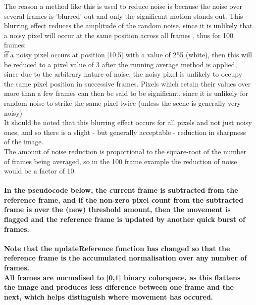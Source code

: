 The reason a method like this is used to reduce noise is because the noise over several frames is 'blurred' out and only the significant motion stands out. This blurring effect reduces the amplitude of the random noise, since it is unlikely that a noisy pixel will occur at the same position across all frames , thus for 100 frames: \\\t if a noisy pixel occurs at position [10,5] with a value of 255 (white), then this will be reduced to a pixel value of 3 after the running average method is applied, since due to the arbitrary nature of noise, the noisy pixel is unlikely to occupy the same pixel position in successive frames. Pixels which retain their values over more than a few frames can then be said to be significant, since it is unlikely for random noise to strike the same pixel twice (unless the scene is generally very noisy)\\
It should be noted that this blurring effect occurs for all pixels and not just noisy ones, and so there is a slight - but generally acceptable - reduction in sharpness of the image.\\
The amount of noise reduction is proportional to the square-root of the number of frames being averaged, so in the 100 frame example the reduction of noise would be a factor of 10.

\paragraph{
In the pseudocode below, the current frame is subtracted from the reference frame, and if the non-zero pixel count from the subtracted frame is over the (new) threshold amount, then the movement is flagged and the reference frame is updated by another quick burst of frames.
}
\begin{frame}[fragile]
	
\end{frame}
\paragraph{Note that the updateReference function has changed so that the reference frame is the accumulated normalisation over any number of frames. \\
All frames are normalised to [0,1]  binary colorspace, as this flattens the image and produces less diference between one frame and the next, which helps distinguish where movement has occured.
}

